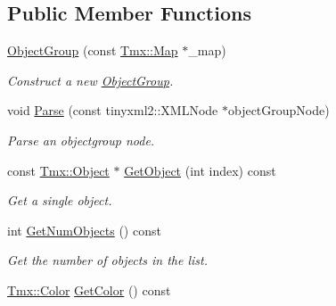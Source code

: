 \subsection*{Public Member Functions}
\begin{DoxyCompactItemize}
\item 
\hypertarget{classTmx_1_1ObjectGroup_a99d89c89cd3262d19f4e30d6ba04667d}{\hyperlink{classTmx_1_1ObjectGroup_a99d89c89cd3262d19f4e30d6ba04667d}{Object\-Group} (const \hyperlink{classTmx_1_1Map}{Tmx\-::\-Map} $\ast$\-\_\-map)}\label{classTmx_1_1ObjectGroup_a99d89c89cd3262d19f4e30d6ba04667d}

\begin{DoxyCompactList}\small\item\em Construct a new \hyperlink{classTmx_1_1ObjectGroup}{Object\-Group}. \end{DoxyCompactList}\item 
\hypertarget{classTmx_1_1ObjectGroup_a641f391664b74b67a3e46489750589c6}{void \hyperlink{classTmx_1_1ObjectGroup_a641f391664b74b67a3e46489750589c6}{Parse} (const tinyxml2\-::\-X\-M\-L\-Node $\ast$object\-Group\-Node)}\label{classTmx_1_1ObjectGroup_a641f391664b74b67a3e46489750589c6}

\begin{DoxyCompactList}\small\item\em Parse an objectgroup node. \end{DoxyCompactList}\item 
\hypertarget{classTmx_1_1ObjectGroup_a223a60fc76682a7a4a4b4c69fb257395}{const \hyperlink{classTmx_1_1Object}{Tmx\-::\-Object} $\ast$ \hyperlink{classTmx_1_1ObjectGroup_a223a60fc76682a7a4a4b4c69fb257395}{Get\-Object} (int index) const }\label{classTmx_1_1ObjectGroup_a223a60fc76682a7a4a4b4c69fb257395}

\begin{DoxyCompactList}\small\item\em Get a single object. \end{DoxyCompactList}\item 
\hypertarget{classTmx_1_1ObjectGroup_a6e327fa2f4b9e70b526811c50e634aa4}{int \hyperlink{classTmx_1_1ObjectGroup_a6e327fa2f4b9e70b526811c50e634aa4}{Get\-Num\-Objects} () const }\label{classTmx_1_1ObjectGroup_a6e327fa2f4b9e70b526811c50e634aa4}

\begin{DoxyCompactList}\small\item\em Get the number of objects in the list. \end{DoxyCompactList}\item 
\hypertarget{classTmx_1_1ObjectGroup_a67ac49ea10129de947f7fe971727c65f}{\hyperlink{classTmx_1_1Color}{Tmx\-::\-Color} \hyperlink{classTmx_1_1ObjectGroup_a67ac49ea10129de947f7fe971727c65f}{Get\-Color} () const }\label{classTmx_1_1ObjectGroup_a67ac49ea10129de947f7fe971727c65f}


\end{DoxyCompactItemize}
